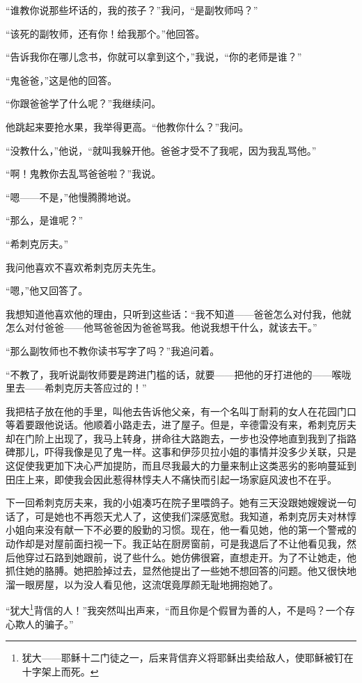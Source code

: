 \par “谁教你说那些坏话的，我的孩子？”我问，“是副牧师吗？”
\par “该死的副牧师，还有你！给我那个。”他回答。
\par “告诉我你在哪儿念书，你就可以拿到这个，”我说，“你的老师是谁？”
\par “鬼爸爸，”这是他的回答。
\par “你跟爸爸学了什么呢？”我继续问。
\par 他跳起来要抢水果，我举得更高。“他教你什么？”我问。
\par “没教什么，”他说，“就叫我躲开他。爸爸才受不了我呢，因为我乱骂他。”
\par “啊！鬼教你去乱骂爸爸啦？”我说。
\par “嗯——不是，”他慢腾腾地说。
\par “那么，是谁呢？”
\par “希刺克厉夫。”
\par 我问他喜欢不喜欢希刺克厉夫先生。
\par “嗯，”他又回答了。
\par 我想知道他喜欢他的理由，只听到这些话：“我不知道——爸爸怎么对付我，他就怎么对付爸爸——他骂爸爸因为爸爸骂我。他说我想干什么，就该去干。”
\par “那么副牧师也不教你读书写字了吗？”我追问着。
\par “不教了，我听说副牧师要是跨进门槛的话，就要——把他的牙打进他的——喉咙里去——希刺克厉夫答应过的！”
\par 我把桔子放在他的手里，叫他去告诉他父亲，有一个名叫丁耐莉的女人在花园门口等着要跟他说话。他顺着小路走去，进了屋子。但是，辛德雷没有来，希刺克厉夫却在门阶上出现了，我马上转身，拼命往大路跑去，一步也没停地直到我到了指路碑那儿，吓得我像是见了鬼一样。这事和伊莎贝拉小姐的事情并没多少关联，只是这促使我更加下决心严加提防，而且尽我最大的力量来制止这类恶劣的影响蔓延到田庄上来，即使我会因此惹得林惇夫人不痛快而引起一场家庭风波也不在乎。
\par 下一回希刺克厉夫来，我的小姐凑巧在院子里喂鸽子。她有三天没跟她嫂嫂说一句话了，可是她也不再怨天尤人了，这使我们深感宽慰。我知道，希刺克厉夫对林惇小姐向来没有献一下不必要的殷勤的习惯。现在，他一看见她，他的第一个警戒的动作却是对屋前面扫视一下。我正站在厨房窗前，可是我退后了不让他看见我，然后他穿过石路到她跟前，说了些什么。她仿佛很窘，直想走开。为了不让她走，他抓住她的胳膊。她把脸掉过去，显然他提出了一些她不想回答的问题。他又很快地溜一眼房屋，以为没人看见他，这流氓竟厚颜无耻地拥抱她了。
\par “犹大\footnote{犹大——耶稣十二门徒之一，后来背信弃义将耶稣出卖给敌人，使耶稣被钉在十字架上而死。}背信的人！”我突然叫出声来，“而且你是个假冒为善的人，不是吗？一个存心欺人的骗子。”
